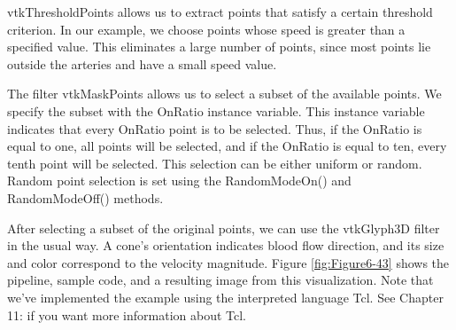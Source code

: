 vtkThresholdPoints allows us to extract points that satisfy a certain threshold criterion. In our example, we choose points whose speed is greater than a specified value. This eliminates a large number of points, since most points lie outside the arteries and have a small speed value.

The filter vtkMaskPoints allows us to select a subset of the available points. We specify the subset with the OnRatio instance variable. This instance variable indicates that every OnRatio point is to be selected. Thus, if the OnRatio is equal to one, all points will be selected, and if the OnRatio is equal to ten, every tenth point will be selected. This selection can be either uniform or random. Random point selection is set using the RandomModeOn() and RandomModeOff() methods.

After selecting a subset of the original points, we can use the vtkGlyph3D filter in the usual way. A cone's orientation indicates blood flow direction, and its size and color correspond to the velocity magnitude. Figure \ref{fig:Figure6-43} shows the pipeline, sample code, and a resulting image from this visualization. Note that we've implemented the example using the interpreted language Tcl. See Chapter 11:  if you want more information about Tcl.

